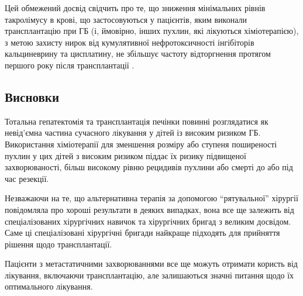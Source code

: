 Цей обмежений досвід свідчить про те, що зниження мінімальних рівнів такролімусу в крові, що застосовуються у пацієнтів, яким виконали трансплантацію при ГБ (і, ймовірно, інших пухлин, які лікуються хіміотерапією), з метою захисту нирок від кумулятивної нефротоксичності інгібіторів кальциневрину та цисплатину, не збільшує частоту відторгнення протягом першого року після трансплантації \cite{pmid20223320}.


\subsection{Висновки}

Тотальна гепатектомія та трансплантація печінки повинні розглядатися як невід’ємна частина сучасного лікування у дітей із високим ризиком ГБ. Використання хіміотерапії для зменшення розміру або ступеня поширеності пухлин у цих дітей з високим ризиком піддає їх ризику підвищеної захворюваності, більш високому рівню рецидивів пухлини або смерті до або під час резекції. 

Незважаючи на те, що альтернативна терапія за допомогою “рятувальної” хірургії повідомляла про хороші результати в деяких випадках, вона все ще залежить від спеціалізованих хірургічних навичок та хірургічних бригад з великим досвідом. Саме ці спеціалізовані хірургічні бригади найкраще підходять для прийняття рішення щодо трансплантації. 

Пацієнти з метастатичними захворюваннями все ще можуть отримати користь від лікування, включаючи трансплантацію, але залишаються значні питання щодо їх оптимального лікування. 
